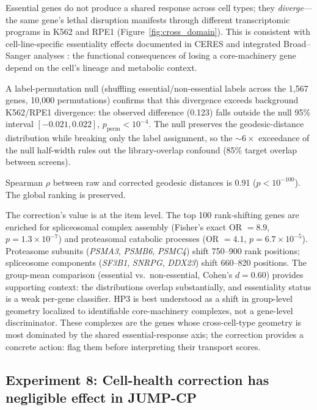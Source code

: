 \documentclass[11pt]{article}
\begin{document}
Essential genes do not produce a shared response across cell types; they
\emph{diverge}---the same gene's lethal disruption manifests through
different transcriptomic programs in K562 and RPE1
(Figure~\ref{fig:cross_domain}). This is consistent with cell-line-specific
essentiality effects documented in CERES \citep{meyers2017ceres} and
integrated Broad--Sanger analyses \citep{pacini2021integrated}: the
functional consequences of losing a core-machinery gene depend on
the cell's lineage and metabolic context.

A label-permutation null (shuffling essential/non-essential labels across
the 1{,}567 genes, 10{,}000 permutations) confirms that this divergence
exceeds background K562/RPE1 divergence: the observed difference (0.123)
falls outside the null 95\% interval $[-0.021, 0.022]$,
$p_{\text{perm}} < 10^{-4}$. The null preserves the geodesic-distance
distribution while breaking only the label assignment, so the ${\sim}6\times$
exceedance of the null half-width rules out the library-overlap confound
(85\% target overlap between screens).

Spearman $\rho$ between raw and corrected geodesic distances is 0.91
($p < 10^{-100}$). The global ranking is preserved.

The correction's value is at the item level. The top 100 rank-shifting
genes are enriched for spliceosomal complex assembly (Fisher's exact
OR $= 8.9$, $p = 1.3 \times 10^{-7}$) and proteasomal catabolic
processes (OR $= 4.1$, $p = 6.7 \times 10^{-5}$). Proteasome subunits
(\emph{PSMA3}, \emph{PSMB6}, \emph{PSMC4}) shift 750--900 rank positions;
spliceosome components (\emph{SF3B1}, \emph{SNRPG}, \emph{DDX23}) shift
660--820 positions. The group-mean comparison (essential vs.\ non-essential,
Cohen's $d = 0.60$) provides supporting context: the distributions overlap
substantially, and essentiality status is a weak per-gene classifier.
HP3 is best understood as a shift in group-level geometry localized to
identifiable core-machinery complexes, not a gene-level discriminator.
These complexes are the genes whose cross-cell-type geometry is most
dominated by the shared essential-response axis; the correction provides a
concrete action: flag them before interpreting their transport scores.

\subsection{Experiment 8: Cell-health correction has negligible
effect in JUMP-CP}
\end{document}

